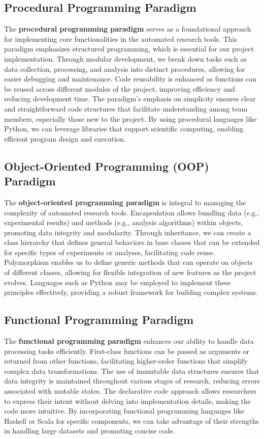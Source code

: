 \subsection{Procedural Programming Paradigm}
The \textbf{procedural programming paradigm} serves as a foundational approach for implementing core functionalities in the automated research tools. This paradigm emphasizes structured programming, which is essential for our project implementation. Through modular development, we break down tasks such as data collection, processing, and analysis into distinct procedures, allowing for easier debugging and maintenance. Code reusability is enhanced as functions can be reused across different modules of the project, improving efficiency and reducing development time. The paradigm's emphasis on simplicity ensures clear and straightforward code structures that facilitate understanding among team members, especially those new to the project. By using procedural languages like Python, we can leverage libraries that support scientific computing, enabling efficient program design and execution.

\subsection{Object-Oriented Programming (OOP) Paradigm}

The \textbf{object-oriented programming paradigm} is integral to managing the complexity of automated research tools. Encapsulation allows bundling data (e.g., experimental results) and methods (e.g., analysis algorithms) within objects, promoting data integrity and modularity. Through inheritance, we can create a class hierarchy that defines general behaviors in base classes that can be extended for specific types of experiments or analyses, facilitating code reuse. Polymorphism enables us to define generic methods that can operate on objects of different classes, allowing for flexible integration of new features as the project evolves. Languages such as Python may be employed to implement these principles effectively, providing a robust framework for building complex systems.

\subsection{Functional Programming Paradigm}

The \textbf{functional programming paradigm} enhances our ability to handle data processing tasks efficiently. First-class functions can be passed as arguments or returned from other functions, facilitating higher-order functions that simplify complex data transformations. The use of immutable data structures ensures that data integrity is maintained throughout various stages of research, reducing errors associated with mutable states. The declarative code approach allows researchers to express their intent without delving into implementation details, making the code more intuitive. By incorporating functional programming languages like Haskell or Scala for specific components, we can take advantage of their strengths in handling large datasets and promoting concise code.

